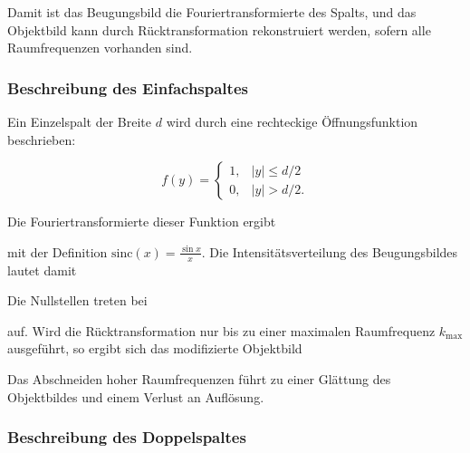 
Damit ist das Beugungsbild die Fouriertransformierte des Spalts, und das Objektbild kann durch Rücktransformation rekonstruiert werden, sofern alle Raumfrequenzen vorhanden sind.

\subsubsection[Einfachspalt]{Beschreibung des Einfachspaltes}


Ein Einzelspalt der Breite \( d \) wird durch eine rechteckige Öffnungsfunktion beschrieben:

\[
    f(y) =
    \begin{cases}
        1, & |y| \le d/2 \\
        0, & |y| > d/2 .
    \end{cases}
\]

Die Fouriertransformierte dieser Funktion ergibt


mit der Definition \( \mathrm{sinc}(x) = \frac{\sin x}{x} \). Die Intensitätsverteilung des Beugungsbildes lautet damit


Die Nullstellen treten bei


auf. Wird die Rücktransformation nur bis zu einer maximalen Raumfrequenz \( k_{\text{max}} \) ausgeführt, so ergibt sich das modifizierte Objektbild


Das Abschneiden hoher Raumfrequenzen führt zu einer Glättung des Objektbildes und einem Verlust an Auflösung.

\subsubsection[Doppelspalt]{Beschreibung des Doppelspaltes}


